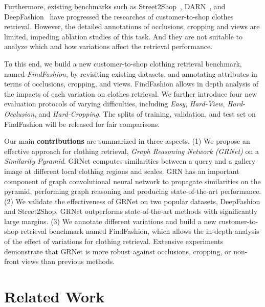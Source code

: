 \documentclass[10pt,twocolumn,letterpaper]{article}
\begin{document}
Furthermore,
existing benchmarks such as Street2Shop~\cite{Kiapour2015}, DARN~\cite{Huang2015}, and DeepFashion~\cite{Liu2016} have progressed the researches of customer-to-shop clothes retrieval. However, the detailed annotations of occlusions, cropping and views are limited, impeding ablation studies of this task. And they are not suitable to analyze which and how variations affect the retrieval performance.


To this end, we build a new customer-to-shop clothing retrieval benchmark, named \emph{FindFashion}, by revisiting existing datasets, and annotating attributes in terms of occlusions, cropping, and views. FindFashion allows in depth analysis of the impacts of each variation on clothes retrieval. We further introduce four new evaluation protocols of varying difficulties, including \textit{Easy}, \textit{Hard-View}, \textit{Hard-Occlusion}, and \textit{Hard-Cropping}. The splits of training, validation, and test set on FindFashion will be released for fair comparisons.



Our main \textbf{contributions} are summarized in three aspects.
(1) We propose an effective approach for clothing retrieval, \emph{Graph Reasoning Network (GRNet)} on a \emph{Similarity Pyramid}. GRNet computes similarities between a query and a gallery image at different local clothing regions and scales. GRN has an important component of graph convolutional neural network to propagate similarities on the pyramid, performing graph reasoning and producing state-of-the-art performance.
(2) We validate the effectiveness of GRNet on two popular datasets, DeepFashion and Street2Shop. GRNet outperforms state-of-the-art methods with significantly large margins.
(3) We annotate different variations and build a new customer-to-shop retrieval benchmark named FindFashion, which allows the in-depth analysis of the effect of variations for clothing retrieval. Extensive experiments demonstrate that GRNet is more robust against occlusions, cropping, or non-front views than previous methods.




\section{Related Work}
\end{document}
